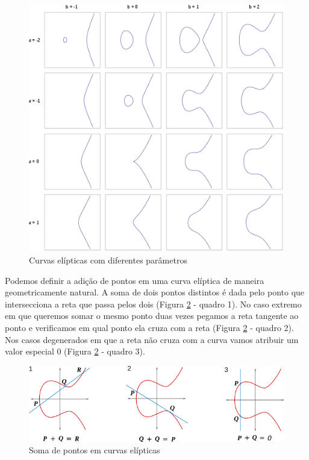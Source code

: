 \begin{figure}[htbp]
  \centering
  \includegraphics[width=.8\textwidth]{imagens/EllipticCurves.png}
  \caption{Curvas elípticas com diferentes parâmetros}
  \label{fig:curvas-elipticas}
\end{figure}

Podemos definir a adição de pontos em uma curva elíptica de maneira geometricamente natural.
A soma de dois pontos distintos é dada pelo ponto que intersecciona a reta que passa pelos dois (Figura \ref{fig:soma-eliptica} - quadro 1).
No caso extremo em que queremos somar o mesmo ponto duas vezes pegamos a reta tangente ao ponto e verificamos em qual ponto ela cruza com a reta (Figura \ref{fig:soma-eliptica} - quadro 2).
Nos casos degenerados em que a reta não cruza com a curva vamos atribuir um valor especial $0$ (Figura \ref{fig:soma-eliptica} - quadro 3).

\begin{figure}[htbp]
  \centering
  \includegraphics[width=\textwidth]{imagens/ECClines2.png}
  \caption{Soma de pontos em curvas elípticas}
  \label{fig:soma-eliptica}
\end{figure}

